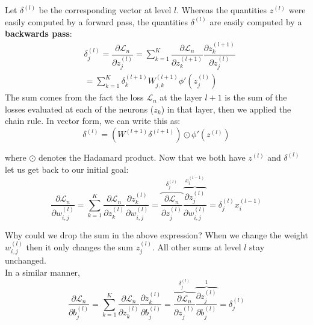 \documentclass[twoside]{article}
\begin{document}
Let $\delta ^{(l)}$ be the corresponding vector at level $l$. Whereas the
quantities $z^{(l)}$ were easily computed by a forward pass, the quantities $\delta^{(l)}$
are easily computed by a \textbf{backwards pass}:
\begin{equation*}
\begin{aligned}
   & \delta^{(l)}_{j} =  \dfrac{\partial \mathcal{L}_{n} }{\partial z^{(l)}_{j}} =
   \sum_{k=1}^{K} \dfrac{\partial \mathcal{L}_{n} }{\partial z^{(l+1)}_{k}} \dfrac{\partial z^{(l+1)}_{k}}{\partial z^{(l)}_{j}} 
   \\
   & = \sum_{k=1}^{K} \delta_{k}^{(l+1)} W^{(l+1)}_{j,k} \phi'(z_{j}^{(l)})
  \end{aligned}
\end{equation*}
The sum comes from the fact the loss $\mathcal{L}_{n}$ at the layer $l+1$ is the sum of the losses evaluated at each of the neurons ($z_{k}$) in that layer, then we applied the chain rule. In vector form, we can write this as:
$$\delta^{(l)} = (W^{(l+1)}\delta^{(l+1)}) \odot \phi'(z^{(l)})$$

where $\odot$ denotes the Hadamard product. Now that we both have $z^{(l)}$ and $\delta^{(l)}$ let us get back to our initial goal:
$$\dfrac{\partial \mathcal{L}_{n} }{\partial w^{(l)}_{i,j}} = \sum_{k=1}^{K} \dfrac{\partial \mathcal{L}_{n} }{\partial z^{(l)}_{k}}  \dfrac{\partial z^{(l)}_{k}}{\partial w^{(l)}_{i,j}} = 
\overbrace{\dfrac{\partial \mathcal{L}_{n} }{\partial z^{(l)}_{j}}}^\text{$\delta^{(l)}_{j}$}  \overbrace{\dfrac{\partial z^{(l)}_{j}}{\partial w^{(l)}_{i,j}}}^\text{$x_{i}^{(l-1)}$} =\delta^{(l)}_{j}  x_{i}^{(l-1)}$$

Why could we drop the sum in the above expression? When we change the weight $w^{(l)}_{i,j}$ then it only changes the sum $z^{(l)}_{j}$.
All other sums at level $l$ stay unchanged.
\\In a similar manner,
$$\dfrac{\partial \mathcal{L}_{n} }{\partial b^{(l)}_{j}} = \sum_{k=1}^{K} \dfrac{\partial \mathcal{L}_{n} }{\partial z^{(l)}_{k}}  \dfrac{\partial z^{(l)}_{k}}{\partial b^{(l)}_{j}} = 
\overbrace{\dfrac{\partial \mathcal{L}_{n} }{\partial z^{(l)}_{j}}}^\text{$\delta^{(l)}_{j}$}  \overbrace{\dfrac{\partial z^{(l)}_{j}}{\partial b^{(l)}_{j}}}^\text{$1$} =\delta^{(l)}_{j} $$ \newpage
\end{document}
